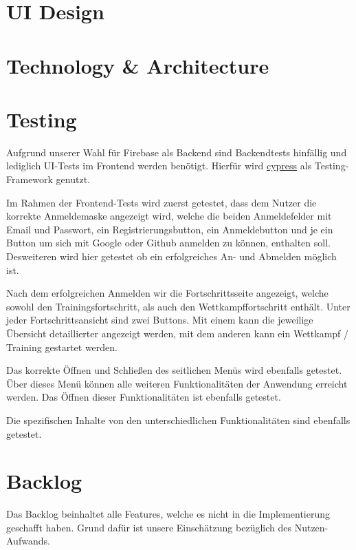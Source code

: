 \documentclass[a4paper]{article}
\theoremstyle{definition}
\begin{document}
\section{UI Design}
\section{Technology \& Architecture}

\section{Testing}
Aufgrund unserer Wahl für Firebase als Backend sind Backendtests hinfällig und lediglich UI-Tests im Frontend werden benötigt. Hierfür wird \href{https://www.cypress.io/}{cypress} als Testing-Framework genutzt.

Im Rahmen der Frontend-Tests wird zuerst getestet, dass dem Nutzer die korrekte Anmeldemaske angezeigt wird, welche die beiden Anmeldefelder mit Email und Passwort, ein Registrierungsbutton, ein Anmeldebutton und je ein Button um sich mit Google oder Github anmelden zu können, enthalten soll. Desweiteren wird hier getestet ob ein erfolgreiches An- und Abmelden möglich ist.

Nach dem erfolgreichen Anmelden wir die Fortschrittsseite angezeigt, welche sowohl den Trainingsfortschritt, als auch den Wettkampffortschritt enthält. Unter jeder Fortschrittsansicht sind zwei Buttons. Mit einem kann die jeweilige Übersicht detaillierter angezeigt werden, mit dem anderen kann ein Wettkampf / Training gestartet werden.

Das korrekte Öffnen und Schließen des seitlichen Menüs wird ebenfalls getestet. Über dieses Menü können alle weiteren Funktionalitäten der Anwendung erreicht werden. Das Öffnen dieser Funktionalitäten ist ebenfalls getestet.

Die spezifischen Inhalte von den unterschiedlichen Funktionalitäten sind ebenfalls getestet.

\section{Backlog}
Das Backlog beinhaltet alle Features, welche es nicht in die Implementierung geschafft haben. Grund dafür ist
unsere Einschätzung bezüglich des Nutzen-Aufwands.
\end{document}
